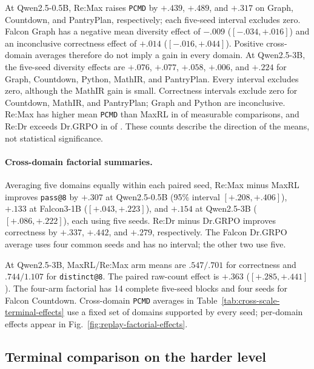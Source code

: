 \documentclass{article}
\makeatletter
\newcommand{\1}{\mathbf 1}
\newcommand{\pmd}{\texttt{PCMD}}
\newcommand{\distk}{\texttt{distinct@8}}
\theoremstyle{remark}
\theoremstyle{definition}
\theoremstyle{plain}
\makeatother
\begin{document}
At Qwen2.5-0.5B, Re:Max raises \pmd{} by $+.439$, $+.489$, and $+.317$ on
Graph, Countdown, and PantryPlan, respectively; each five-seed interval
excludes zero. Falcon Graph has a negative mean diversity effect of $-.009$
($[-.034,+.016]$) and an inconclusive correctness effect of $+.014$
($[-.016,+.044]$). Positive cross-domain averages therefore do not imply a
gain in every domain. At Qwen2.5-3B, the five-seed diversity effects are
$+.076$, $+.077$, $+.058$, $+.006$, and $+.224$ for Graph, Countdown, Python,
MathIR, and PantryPlan. Every interval excludes zero, although the MathIR
gain is small. Correctness intervals exclude zero for Countdown, MathIR,
and PantryPlan; Graph and Python are inconclusive. Re:Max has higher mean
\pmd{} than MaxRL in \PMDaboveReMax{} of \PMDblocksReMax{} measurable
comparisons, and Re:Dr exceeds Dr.GRPO in \PMDaboveReDr{} of
\PMDblocksReDr{}. These counts describe the direction of the means, not
statistical significance.

\paragraph{Cross-domain factorial summaries.}
\label{app:factorial-numerical-detail}
Averaging five domains equally within each paired seed, Re:Max minus MaxRL
improves \texttt{pass@8} by $+.307$ at Qwen2.5-0.5B (95\% interval
$[+.208,+.406]$), $+.133$ at Falcon3-1B ($[+.043,+.223]$), and $+.154$ at
Qwen2.5-3B ($[+.086,+.222]$), each using five seeds. Re:Dr minus Dr.GRPO
improves correctness by $+.337$, $+.442$, and $+.279$, respectively. The
Falcon Dr.GRPO average uses four common seeds and has no interval; the other
two use five.

At Qwen2.5-3B, MaxRL/Re:Max arm means are $.547/.701$ for correctness and
$.744/1.107$ for \distk{}. The paired raw-count effect is $+.363$
($[+.285,+.441]$). The four-arm factorial has 14 complete five-seed blocks
and four seeds for Falcon Countdown. Cross-domain \pmd{} averages in
Table~\ref{tab:cross-scale-terminal-effects} use a fixed set of domains
supported by every seed; per-domain effects appear in
Fig.~\ref{fig:replay-factorial-effects}.

\subsection{Terminal comparison on the harder level}
\label{app:level2-interim}
\end{document}
